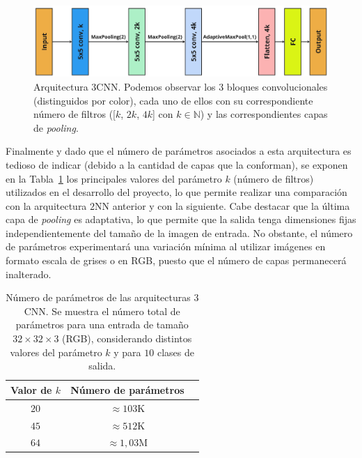 \begin{figure}[h]
    \centering
    \includegraphics[width=0.8\linewidth]{img/experiments/3CNN.png}
    \caption[Arquitectura $3$CNN.]{Arquitectura $3$CNN. Podemos observar los $3$ bloques convolucionales (distinguidos por color), cada uno de ellos con su correspondiente número de filtros ([$k$, $2k$, $4k$] con $k \in \mathbb{N}$) y las correspondientes capas de \textit{pooling}.}\label{fig:3CNN}
\end{figure}

Finalmente y dado que el número de parámetros asociados a esta arquitectura es tedioso de indicar (debido a la cantidad de capas que la conforman), se exponen en la Tabla~\ref{tab:numero-parametros3cnn} los principales valores del parámetro $k$ (número de filtros) utilizados en el desarrollo del proyecto, lo que permite realizar una comparación con la arquitectura $2$NN anterior y con la siguiente. Cabe destacar que la última capa de \textit{pooling} es adaptativa, lo que permite que la salida tenga dimensiones fijas independientemente del tamaño de la imagen de entrada. No obstante, el número de parámetros experimentará una variación mínima al utilizar imágenes en formato escala de grises o en RGB, puesto que el número de capas permanecerá inalterado.

\begin{table}[ht]
    \centering
    \begin{tabular}{|c|c|c|}
    \hline
    \textbf{Valor de $k$}           & \textbf{Número de parámetros}                     
    \\ \hline
    $20$                  & $\approx 103$\space K                                            \\ \hline
    $45$                  & $\approx 512$\space K                                             \\ \hline
    $64$                  & $\approx 1,03$\space M                                             \\ \hline
    \end{tabular}
    \caption[Número de parámetros de las arquitecturas $3$CNN.]{Número de parámetros de las arquitecturas $3$CNN. Se muestra el número total de parámetros para una entrada de tamaño $32 \times 32 \times 3$ (RGB), considerando distintos valores del parámetro $k$ y para $10$ clases de salida.}\label{tab:numero-parametros3cnn}
\end{table}

